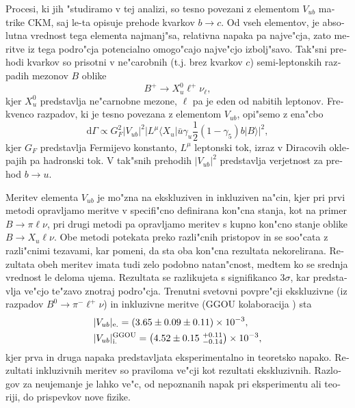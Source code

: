 \begin{otherlanguage}{slovene}
Procesi, ki jih "studiramo v tej analizi, so tesno povezani z elementom $V_{ub}$ matrike CKM, saj le-ta opisuje prehode kvarkov $b \to c$. Od vseh elementov, je absolutna vrednost tega elementa najmanj"sa, relativna napaka pa najve"cja, zato meritve iz tega podro"cja potencialno omogo"cajo najve"cjo izbolj"savo. Tak"sni prehodi kvarkov so prisotni v ne"carobnih (t.j. brez kvarkov $c$) semi-leptonskih razpadih mezonov $B$ oblike 
\begin{equation}
B^+ \to X_u^0 \ell^+ \nu_\ell,
\end{equation}
kjer $X_u^0$ predstavlja ne"carnobne mezone, $\ell$ pa je eden od nabitih leptonov. Frekvenco razpadov, ki je tesno povezana z elementom $V_{ub}$, opi"semo z ena"cbo
\begin{equation}
\mathrm{d} \Gamma \propto G_F^2 \vert V_{ub} \vert ^2 \vert L^\mu \langle X_u \vert \bar u \gamma_u \frac{1}{2} (1-\gamma_5) b \vert B \rangle \vert ^2,
\end{equation}
kjer $G_F$ predstavlja Fermijevo konstanto, $L^\mu$ leptonski tok, izraz v Diracovih oklepajih pa hadronski tok. V tak"snih prehodih $\vert V_{ub} \vert ^2$ predstavlja verjetnost za prehod $b \to u$.

Meritev elementa $V_{ub}$ je mo"zna na ekskluziven in inkluziven na"cin, kjer pri prvi metodi opravljamo meritve v specifi"cno definirana kon"cna stanja, kot na primer $B \to \pi \ell \nu$, pri drugi metodi pa opravljamo meritev s kupno kon"cno stanje oblike $B \to X_u \ell \nu$. Obe metodi potekata preko razli"cnih pristopov in se soo"cata z razli"cnimi tezavami, kar pomeni, da sta oba kon"cna rezultata nekorelirana. Rezultata obeh meritev imata tudi zelo podobno natan"cnost, medtem ko se srednja vrednost le deloma ujema. Rezultata se razlikujeta s signifikanco $3\sigma$, kar predstavlja ve"cjo te"zavo znotraj podro"cja. Trenutni svetovni povpre"cji \cite{Amhis:2016xyh} ekskluzivne (iz razpadov $B^0 \to \pi^- \ell^+ \nu$) in inkluzivne meritve (GGOU kolaboracija \cite{Gambino:2007rp}) sta
\begin{align}
&\vert V_{ub} \vert_{\mathrm{e.}} = \left(3.65 \pm 0.09 \pm 0.11\right)\times 10^{-3},\\
&\vert V_{ub} \vert_{\mathrm{i.}}^{\mathrm{GGOU}} = \left(4.52 \pm 0.15~{}^{+0.11}_{-0.14}\right)\times 10^{-3},
\end{align}
kjer prva in druga napaka predstavljata eksperimentalno in teoretsko napako. Rezultati inkluzivnih meritev so praviloma ve"cji kot rezultati ekskluzivnih. Razlogov za neujemanje je lahko ve"c, od nepoznanih napak pri eksperimentu ali teoriji, do prispevkov nove fizike.


\end{otherlanguage}
